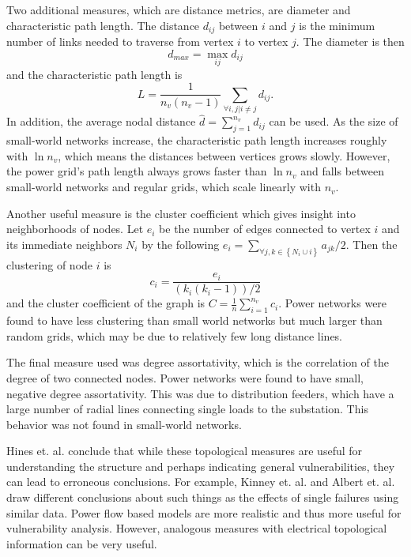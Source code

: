 Two additional measures, which are distance metrics, are diameter and characteristic path length.  The distance $d_{ij}$ between $i$ and $j$ is the minimum number of links needed to traverse from vertex $i$ to vertex $j$.  The diameter is then 
\begin{equation}
d_{max} = \max_{ij} d_{ij}
\end{equation}
 and the characteristic path length is 
\begin{equation}
L = \frac{1}{n_v (n_v -1)} \sum_{\forall i,j | i \neq j} d_{ij}.
\end{equation}
In addition, the average nodal distance $\hat{d} = \sum_{j=1}^{n_v} d_{ij}$ can be used.  As the size of small-world networks increase, the characteristic path length increases roughly with $\ln n_v$, which means the distances between vertices grows slowly.  However, the power grid's path length always grows faster than $\ln n_v$ and falls between small-world networks and regular grids, which scale linearly with $n_v$.

Another useful measure is the cluster coefficient which gives insight into neighborhoods of nodes.  Let $e_i$ be the number of edges connected to vertex $i$ and its immediate neighbors $N_i$ by the following $e_i =\sum_{\forall j,k \in \left\{ N_i \cup i \right\}} a_{jk}/2$.  Then the clustering of node $i$ is
\begin{equation}
c_i = \frac{e_i}{(k_i(k_i-1))/2}
\end{equation}
and the cluster coefficient of the graph is $C = \frac{1}{n} \sum_{i=1}^{n_v} c_i$.  Power networks were found to have less clustering than small world networks but much larger than random grids, which may be due to relatively few long distance lines.

The final measure used was degree assortativity, which is the correlation of the degree of two connected nodes.  Power networks were found to have small, negative degree assortativity.  This was due to distribution feeders, which have a large number of radial lines connecting single loads to the substation.  This behavior was not found in small-world networks.

Hines et. al. \cite{hines_2010} conclude that while these topological measures are useful for understanding the structure and perhaps indicating general vulnerabilities, they can lead to erroneous conclusions.  For example, Kinney et. al. \cite{kinney_2005} and Albert et. al. \cite{albert_2004} draw different conclusions about such things as the effects of single failures using similar data.  Power flow based models are more realistic and thus more useful for vulnerability analysis.  However, analogous measures with electrical topological information can be very useful. 


